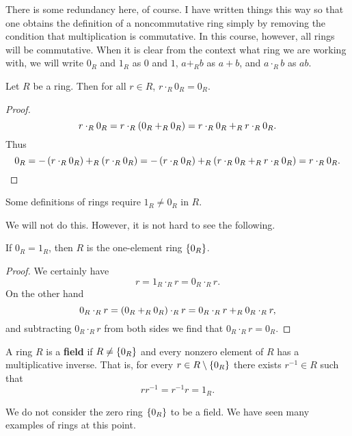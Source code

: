 There is some redundancy here, of course. I have written things this way so that one obtains the definition of a noncommutative ring simply by removing the condition that multiplication is commutative. In this course, however, all rings will be commutative. When it is clear from the context what ring we are working with, we will write $ 0_R $ and $ 1_R $ as $ 0 $ and $ 1 $, $ a +_R b $ as $ a + b $, and $ a \cdot_R b $ as $ ab $.

\begin{proposition}
Let $ R $ be a ring. Then for all $ r \in R $, $ r \cdot_R 0_R = 0_R $.
\end{proposition}

\begin{proof}
$$ r \cdot_R 0_R = r \cdot_R \left( 0_R +_R 0_R \right) = r \cdot_R 0_R +_R r \cdot_R 0_R. $$
Thus
$$ 0_R = -\left( r \cdot_R 0_R \right) +_R \left( r \cdot_R 0_R \right) = -\left( r \cdot_R 0_R \right) +_R \left( r \cdot_R 0_R +_R r \cdot_R 0_R \right) = r \cdot_R 0_R. $$
\end{proof}

\begin{note*}
Some definitions of rings require $ 1_R \ne 0_R $ in $ R $.
\end{note*}

We will not do this. However, it is not hard to see the following.

\begin{proposition}
If $ 0_R = 1_R $, then $ R $ is the one-element ring $ \left\{ 0_R \right\} $.
\end{proposition}

\begin{proof}
We certainly have
$$ r = 1_R \cdot_R r = 0_R \cdot_R r. $$
On the other hand
$$ 0_R \cdot_R r = \left( 0_R +_R 0_R \right) \cdot_R r = 0_R \cdot_R r +_R 0_R \cdot_R r, $$
and subtracting $ 0_R \cdot_R r $ from both sides we find that $ 0_R \cdot_R r = 0_R $.
\end{proof}

\begin{definition}
A ring $ R $ is a \textbf{field} if $ R \ne \left\{ 0_R \right\} $ and every nonzero element of $ R $ has a multiplicative inverse. That is, for every $ r \in R \setminus \left\{ 0_R \right\} $ there exists $ r^{-1} \in R $ such that
$$ rr^{-1} = r^{-1}r = 1_R. $$
\end{definition}

We do not consider the zero ring $ \left\{ 0_R \right\} $ to be a field. We have seen many examples of rings at this point.

